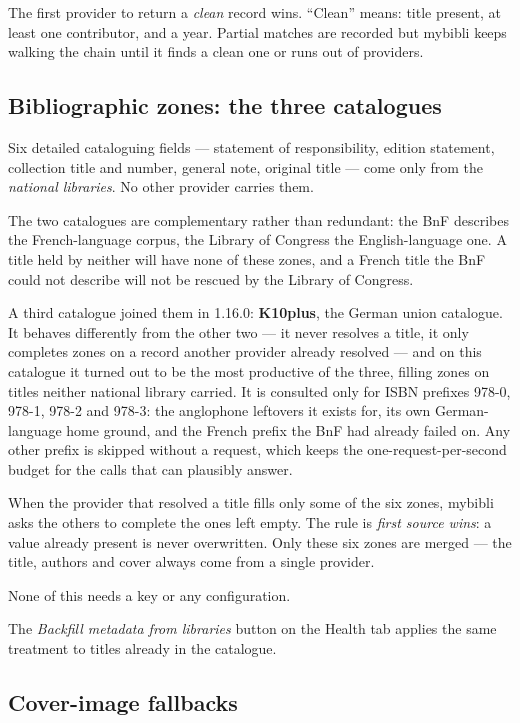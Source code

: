 The first provider to return a \emph{clean} record wins. ``Clean''
means: title present, at least one contributor, and a year. Partial
matches are recorded but mybibli keeps walking the chain until it
finds a clean one or runs out of providers.

\subsection*{Bibliographic zones: the three catalogues}

Six detailed cataloguing fields — statement of responsibility,
edition statement, collection title and number, general note,
original title — come only from the \emph{national libraries}. No
other provider carries them.

The two catalogues are complementary rather than redundant: the BnF
describes the French-language corpus, the Library of Congress the
English-language one. A title held by neither will have none of these
zones, and a French title the BnF could not describe will not be
rescued by the Library of Congress.

A third catalogue joined them in 1.16.0: \textbf{K10plus},
the German union catalogue. It behaves differently from the other two —
it never resolves a title, it only completes zones on a record another
provider already resolved — and on this catalogue it turned out to be
the most productive of the three, filling zones on titles neither
national library carried. It is consulted only for ISBN prefixes 978-0,
978-1, 978-2 and 978-3: the anglophone leftovers it exists for, its own
German-language home ground, and the French prefix the BnF had already
failed on. Any other prefix is skipped without a request, which keeps
the one-request-per-second budget for the calls that can plausibly
answer.

When the provider that resolved a title fills only some of the six
zones, mybibli asks the others to complete the ones left empty. The
rule is \emph{first source wins}: a value already present is never
overwritten. Only these six zones are merged — the title, authors and
cover always come from a single provider.

None of this needs a key or any configuration.

The \emph{Backfill metadata from libraries} button on the Health tab
applies the same treatment to titles already in the catalogue.

\subsection*{Cover-image fallbacks}

